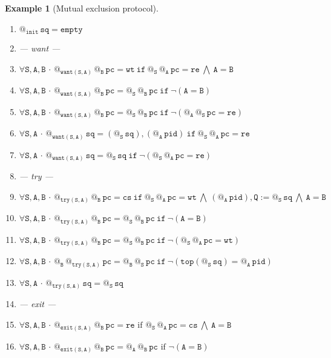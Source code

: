 \documentclass{article}
\makeatletter
\newcommand{\Q}{\mathtt{Q}}
\newcommand{\B}{\mathtt{B}}
\newcommand{\A}{\mathtt{A}}
\renewcommand{\S}{\mathtt{S}}
\newcommand{\pc}{{\mathtt{pc}}}
\newcommand{\pid}{{\mathtt{pid}}}
\newcommand{\sq}{{\mathtt{sq}}}
\newcommand{\re}{{\mathtt{re}}}
\newcommand{\wt}{{\mathtt{wt}}}
\newcommand{\cs}{{\mathtt{cs}}}
\newcommand{\Top}{{\mathtt{top}}}
\newcommand{\If}{{\ \mathtt{if}\ }}
\newcommand{\Empty}{{\mathtt{empty}}}
\newcommand{\init}{{\mathtt{init}}}
\newcommand{\want}{{\mathtt{want}}}
\newcommand{\try}{{\mathtt{try}}}
\newcommand{\exit}{{\mathtt{exit}}}
\newcommand{\at}[1]{@_{#1}\,}
\newcommand{\Forall}[1]{\forall #1\,{\cdot}\,}
\renewcommand{\land}{\ \bigwedge\ }
\newtheorem{example}{Example}
\makeatother
\begin{document}
\begin{example} [Mutual exclusion protocol]
\begin{enumerate}[label=(\arabic*),leftmargin=*]
 \item $\at{\init}\sq=\Empty$ 
 
 \item[] --- want --- 

 \item $\Forall{\S,\A,\B} \at{\want(\S,\A)} \at{\B}  \pc=\wt \If \at{\S} \at{\A} \pc=\re \land \A=\B$
 
 \item $\Forall{\S,\A,\B} \at{\want(\S,\A)} \at{\B} \pc= \at{\S} \at{\B} \pc \If  \neg(\A = \B) $
 
 \item $\Forall{\S,\A,\B} \at{\want(\S,\A)} \at{\B}  \pc= \at{\S} \at{\B} \pc \If  \neg(\at{\A}\at{\S}\pc = \re)$
  
 \item $\Forall{\S,\A} \at{\want(\S,\A)}\sq = (\at{\S}\sq), (\at{\A} \pid) \If \at{\S} \at{\A} \pc=\re$

 \item $\Forall{\S,\A} \at{\want(\S,\A)}\sq = \at{\S}\sq \If \neg(\at{\S} \at{\A} \pc=\re)$  
 
 \item [] --- try ---

 \item $\Forall{\S,\A,\B} \at{\try(\S,\A)} \at{\B} \pc= \cs \If \at{\S} \at{\A} \pc = \wt \land (\at{\A}\pid), \Q := \at{\S} \sq \land \A = \B$
 
 \item $\Forall{\S,\A,\B} \at{\try(\S,\A)} \at{\B} \pc = \at{\S} \at{\B} \pc \If  \neg(\A=\B)$
 
 \item $\Forall{\S,\A,\B} \at{\try(\S,\A)} \at{\B} \pc=  \at{\S}  \at{\B} \pc \If \neg(\at{\S} \at{\A} \pc = \wt )$
  
 \item $\Forall{\S,\A,\B} \at{\B}\at{\try(\S,\A)}\pc= \at{\B} \at{\S} \pc \If  \neg(\Top(\at{\S}\sq) = \at{\A}\pid) $
  

 \item $\Forall{\S,\A} \at{\try(\S,\A)} \sq = \at{\S}\sq$  
 
 \item [] --- exit ---
 
 \item $\Forall{\S, \A,\B}  \at{\exit(\S,\A) }\at{\B}\pc = \re \text{ if } \at{\S} \at{\A} \pc = \cs \land \A = \B$
 
 \item $\Forall{\S, \A,\B}  \at{\exit(\S,\A) }\at{\B}\pc =  \at{\A }\at{\B}\pc \text{ if } \neg(\A = \B)$
 

\end{enumerate}
\end{example}
\end{document}
